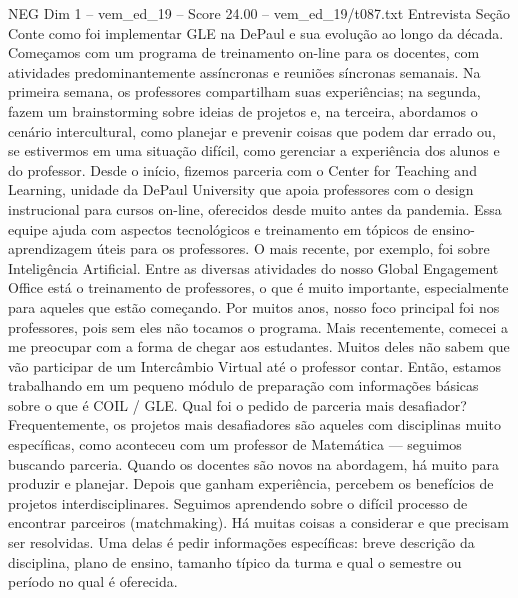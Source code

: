 \begin{textsample}{NEG Dim 1 – vem\_ed\_19 – Score 24.00 – vem\_ed\_19/t087.txt}  \label{ex:f1_neg_146}
Entrevista Seção Conte como foi implementar GLE na DePaul e sua evolução ao longo da década.
Começamos com um programa de treinamento on-line para os docentes, com atividades predominantemente assíncronas e reuniões síncronas semanais.
Na primeira semana, os professores compartilham suas experiências; na segunda, fazem um brainstorming sobre ideias de projetos e, na terceira, abordamos o cenário intercultural, como planejar e prevenir coisas que podem dar errado ou, se estivermos em uma situação difícil, como gerenciar a experiência dos alunos e do professor.
Desde o início, fizemos parceria com o Center for Teaching and Learning, unidade da DePaul University que apoia professores com o design instrucional para cursos on-line, oferecidos desde muito antes da pandemia.
Essa equipe ajuda com aspectos tecnológicos e treinamento em tópicos de ensino-aprendizagem úteis para os professores.
O mais recente, por exemplo, foi sobre Inteligência Artificial.
Entre as diversas atividades do nosso Global Engagement Office está o treinamento de professores, o que é muito importante, especialmente para aqueles que estão começando.
Por muitos anos, nosso foco principal foi nos professores, pois sem eles não tocamos o programa.
Mais recentemente, comecei a me preocupar com a forma de chegar aos estudantes.
Muitos deles não sabem que vão participar de um Intercâmbio Virtual até o professor contar.
Então, estamos trabalhando em um pequeno módulo de preparação com informações básicas sobre o que é COIL / GLE.
Qual foi o pedido de parceria mais desafiador?
Frequentemente, os projetos mais desafiadores são aqueles com disciplinas muito específicas, como aconteceu com um professor de Matemática — seguimos buscando parceria.
Quando os docentes são novos na abordagem, há muito para produzir e planejar.
Depois que ganham experiência, percebem os benefícios de projetos interdisciplinares.
Seguimos aprendendo sobre o difícil processo de encontrar parceiros (matchmaking).
Há muitas coisas a considerar e que precisam ser resolvidas.
Uma delas é pedir informações específicas: breve descrição da disciplina, plano de ensino, tamanho típico da turma e qual o semestre ou período no qual é oferecida.

\end{textsample}
